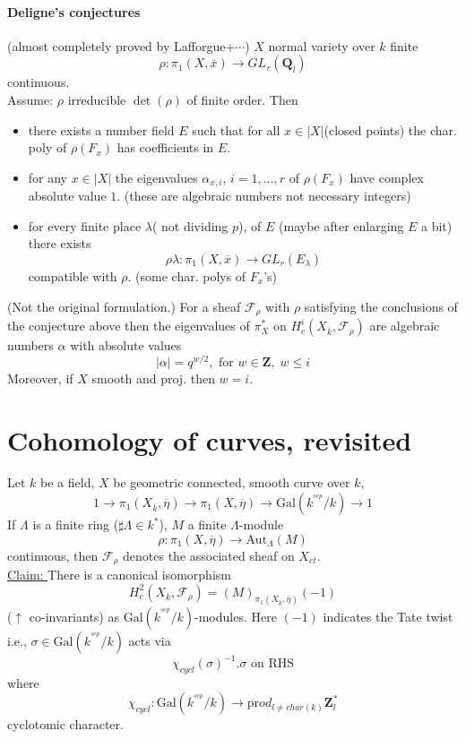 \paragraph{Deligne's conjectures}(almost completely proved by Lafforgue+$\cdots$) $X$ normal variety over $k$ finite
	$$\rho: \pi_1(X, \overline x)\to GL_r(\mathbf{Q}_l) $$
	continuous.\\
Assume: $\rho$ irreducible $\det(\rho)$ of finite order. Then 
	\begin{itemize}
	\item there exists a number field $E$ such that for all $x\in |X|$(closed points) the char. poly of $\rho(F_x)$ has coefficients in $E$. 
	\item for any $x\in |X|$ the eigenvalues $\alpha_{x, i}$, $i=1, \ldots, r$ of $\rho(F_x)$ have complex absolute value $1$. 
	(these are algebraic numbers not necessary integers)
	\item for every finite place $\lambda$( not dividing $p$), of $E$ (maybe after enlarging $E$ a bit) there exists 
	$$\rho\lambda: \pi_1(X, \overline x) \to GL_r(E_\lambda)$$
	compatible with $\rho$. (some char. polys of  $F_x$'s)
	\end{itemize}

\begin{theorem} (Not the original formulation.) For a sheaf $\mathcal{F}_\rho$ with $\rho$ satisfying the conclusions of the conjecture above then the eigenvalues of $\pi_X^*$ on $H_c^i(X_{\overline k}, \mathcal{F}_{\rho})$ are algebraic numbers $\alpha$ with absolute values
	$$|\alpha|=q^{w/2}, \text{ for }w\in \mathbf{Z}, \; w\leq i$$
	Moreover, if $X$ smooth and proj. then $w=i$.
\end{theorem}



\section*{Cohomology of curves, revisited} 
Let $k$ be a field, $X$ be geometric connected, smooth curve over $k$, 
	$$1\to \pi_1(X_{\overline k}, \overline \eta)\to \pi_1(X, \overline\eta)\to \text{Gal}(k^{^{sep}}/k)\to 1$$
If $\Lambda$ is a finite ring ($\sharp\Lambda\in k^*$), $M$ a finite $\Lambda$-module
	$$\rho:\pi_1(X, \overline\eta)\to \text{Aut}_{\Lambda}(M)$$ continuous, 	then $\mathcal{F}_\rho$ denotes the associated sheaf on $X_{et}$.\\
	
\noindent\underline{Claim: } There is a canonical isomorphism
	$$H_c^2(X_{\overline k}, \mathcal{F}_\rho)=(M)_{\pi_1(X_{\overline k}, \overline\eta)}(-1)$$
	($\uparrow$ co-invariants) as $\text{Gal}(k^{^{sep}}/k)$-modules. Here $(-1)$ indicates the Tate twist i.e., $\sigma\in \text{Gal}(k^{^{sep}}/k)$ acts via
	$$\chi_{cycl}(\sigma)^{-1}.\sigma\text{ on RHS}$$
	where 
	$$\chi_{cycl}: \text{Gal}(k^{^{sep}}/k)\to \text{pr}od_{l\neq char(k)}\mathbf{Z}_l^*$$
	cyclotomic character. 


